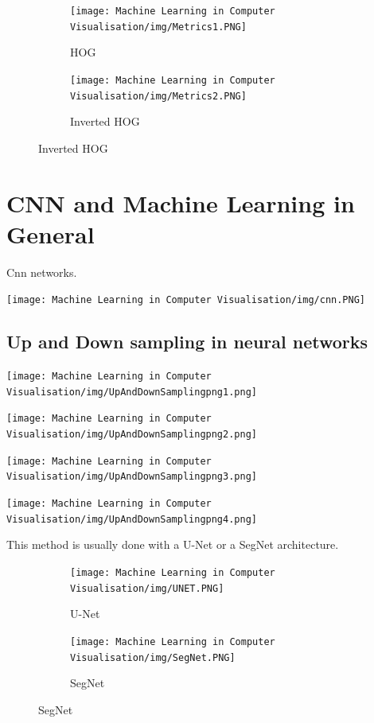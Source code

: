 \documentclass[x11names,11pt,a4paper]{article}
\theoremstyle{definition}
\begin{document}
\begin{figure}[H]
     \centering
     \begin{subfigure}[b]{0.45\textwidth}
         \centering
         \texttt{[image: Machine Learning in Computer Visualisation/img/Metrics1.PNG]}
         \caption{HOG}
     \end{subfigure}
     \hfill
     \begin{subfigure}[b]{0.45\textwidth}
         \centering
         \texttt{[image: Machine Learning in Computer Visualisation/img/Metrics2.PNG]}
         \caption{Inverted HOG}
     \end{subfigure}
\end{figure}


\section{CNN and Machine Learning in General}
Cnn networks.
\begin{center}
	\texttt{[image: Machine Learning in Computer Visualisation/img/cnn.PNG]}
\end{center}

\subsection{Up and Down sampling in neural networks}
\begin{center}
	\texttt{[image: Machine Learning in Computer Visualisation/img/UpAndDownSamplingpng1.png]}
\end{center}
\begin{center}
	\texttt{[image: Machine Learning in Computer Visualisation/img/UpAndDownSamplingpng2.png]}
\end{center}
\begin{center}
	\texttt{[image: Machine Learning in Computer Visualisation/img/UpAndDownSamplingpng3.png]}
\end{center}
\begin{center}
	\texttt{[image: Machine Learning in Computer Visualisation/img/UpAndDownSamplingpng4.png]}
\end{center}

This method is usually done with a U-Net or a SegNet architecture.
\begin{figure}[H]
     \centering
     \begin{subfigure}[b]{0.45\textwidth}
         \centering
         \texttt{[image: Machine Learning in Computer Visualisation/img/UNET.PNG]}
         \caption{U-Net}
     \end{subfigure}
     \hfill
     \begin{subfigure}[b]{0.45\textwidth}
         \centering
         \texttt{[image: Machine Learning in Computer Visualisation/img/SegNet.PNG]}
         \caption{SegNet}
     \end{subfigure}
\end{figure}
\end{document}
